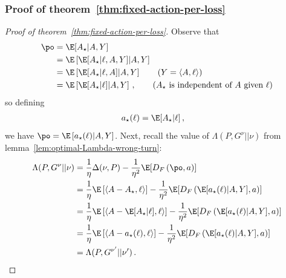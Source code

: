 \subsubsection{Proof of theorem~\ref{thm:fixed-action-per-loss}}
\label{proof:thm:fixed-action-per-loss}
\begin{proof}[Proof of theorem~\ref{thm:fixed-action-per-loss}]
    Observe that
    \begin{align*}
        \po & = \E[A_\star|A, Y] \\
            & = \E\left[
            \E[A_\star|\ell, A, Y]
            | A, Y
        \right]                  \\
            & = \E\left[
            \E[A_\star|\ell, A]
            | A, Y
            \right]
        \tag{$Y = \langle A, \ell \rangle$}
        \\
            & = \E\left[
            \E[A_\star|\ell]
            | A, Y
            \right]\,,
        \tag{$A_\star$ is independent of $A$ given $\ell$}
    \end{align*}
    so defining
    \begin{align*}
        a_\star(\ell) & = \E[A_\star|\ell]\,,
    \end{align*}
    we have $\po = \E\left[
            a_\star(\ell)
            | A, Y
            \right]$.
    Next, recall the value of $\Lambda(P, G^{\nu} || \nu)$ from lemma~\ref{lem:optimal-Lambda-wrong-turn}:
    \begin{align*}
        \Lambda(P, G^{\nu} || \nu)
         & = \frac{1}{\eta}
        \Delta(\nu, P)
        - \frac{1}{\eta^2}
        \E\!\left[
            D_F\left( \po, a\right)
        \right]                                      \\
         & =
        \frac{1}{\eta}
        \E\left[
            \langle A - A_\star, \ell\rangle
            \right]
        - \frac{1}{\eta^2}
        \E\!\left[
            D_F\left( \E[a_\star(\ell)|A, Y], a\right)
        \right]                                      \\
         & =
        \frac{1}{\eta}
        \E\left[
            \langle A - \E[A_\star|\ell], \ell\rangle
            \right]
        - \frac{1}{\eta^2}
        \E\!\left[
            D_F\left( \E[a_\star(\ell)|A, Y], a\right)
        \right]                                      \\
         & =
        \frac{1}{\eta}
        \E\left[
            \langle A - a_\star(\ell), \ell\rangle
            \right]
        - \frac{1}{\eta^2}
        \E\!\left[
            D_F\left( \E[a_\star(\ell)|A, Y], a\right)
        \right]                                      \\
         & = \Lambda(P, G^{\nu'} || \nu')\,.\qedhere
    \end{align*}
\end{proof}

